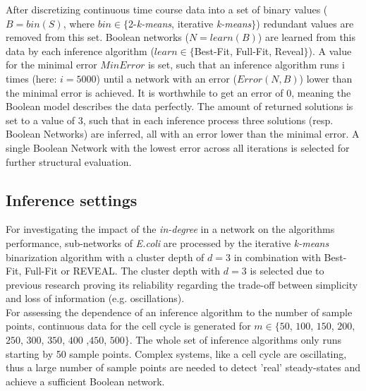\newpage
After discretizing continuous time course data into a set of binary values ($B=bin(S)$, where $bin\in \{ $2-\textit{k-means}, iterative \textit{k-means}$\}$) redundant values are removed from this set. Boolean networks ($N=learn(B)$) are learned from this data by each inference algorithm ($learn\in \{$Best-Fit, Full-Fit, Reveal$\}$). A value for the minimal error $MinError$ is set, such that an inference algorithm runs i times (here: $i=5000$) until a network with an error ($Error(N,B)$) lower than the minimal error is achieved. 
It is worthwhile to get an error of $0$, meaning the Boolean model describes the data perfectly. The amount of returned solutions is set to a value of $3$, such that in each inference process three solutions (resp. Boolean Networks) are inferred, all with an error lower than the minimal error. A single Boolean Network with the lowest error across all iterations is selected for further structural evaluation.
\subsection*{Inference settings}
For investigating the impact of the \textit{in-degree} in a network on the algorithms performance, sub-networks of \textit{E.coli} are processed by the iterative \textit{k-means} binarization algorithm with a cluster depth of $d=3$ in combination with Best-Fit, Full-Fit or REVEAL. The cluster depth with $d=3$ is selected due to previous research proving its reliability regarding the trade-off between simplicity and loss of information (e.g. oscillations).\\
\citep{Berestovsky.2013}
For assessing the dependence of an inference algorithm to the number of sample points, continuous data for the cell cycle is generated for $m\in\{ 50$, $100$, $150$, $200$, $250$, $300$, $350$, $400$ ,$450$, $500\}$. 
The whole set of inference algorithms only runs starting by 50 sample points. Complex systems, like a cell cycle are oscillating, thus a large number of sample points are needed to detect 'real' steady-states and achieve a sufficient Boolean network.\\

